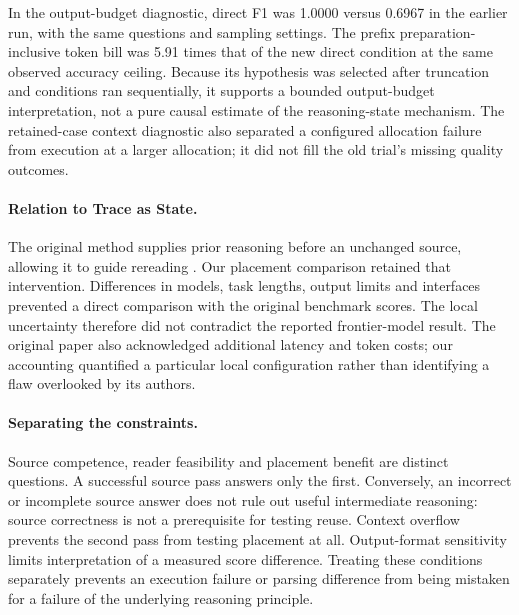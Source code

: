 In the output-budget diagnostic, direct F1 was 1.0000 versus 0.6967 in the earlier run, with the same questions and sampling settings. The prefix preparation-inclusive token bill was 5.91 times that of the new direct condition at the same observed accuracy ceiling. Because its hypothesis was selected after truncation and conditions ran sequentially, it supports a bounded output-budget interpretation, not a pure causal estimate of the reasoning-state mechanism. The retained-case context diagnostic also separated a configured allocation failure from execution at a larger allocation; it did not fill the old trial's missing quality outcomes.


\paragraph{Relation to Trace as State.} The original method supplies prior reasoning before an unchanged source, allowing it to guide rereading \citep{tang2026trace}. Our placement comparison retained that intervention. Differences in models, task lengths, output limits and interfaces prevented a direct comparison with the original benchmark scores. The local uncertainty therefore did not contradict the reported frontier-model result. The original paper also acknowledged additional latency and token costs; our accounting quantified a particular local configuration rather than identifying a flaw overlooked by its authors.

\paragraph{Separating the constraints.} Source competence, reader feasibility and placement benefit are distinct questions. A successful source pass answers only the first. Conversely, an incorrect or incomplete source answer does not rule out useful intermediate reasoning: source correctness is not a prerequisite for testing reuse. Context overflow prevents the second pass from testing placement at all. Output-format sensitivity limits interpretation of a measured score difference. Treating these conditions separately prevents an execution failure or parsing difference from being mistaken for a failure of the underlying reasoning principle.

